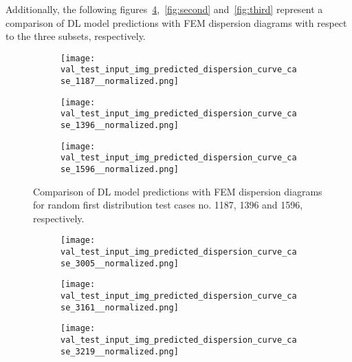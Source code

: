 \documentclass[11pt,a4paper]{report}
\begin{document}
\begin{sloppypar}
		\noindent Additionally, the following figures~\ref{fig:first},~\ref{fig:second} and~\ref{fig:third} represent a comparison of DL model predictions with FEM dispersion diagrams with respect to the three subsets, respectively.
		\begin{figure}[ht!]
			\centering
			\begin{subfigure}[b]{0.32\textwidth}
				\centering
				\texttt{[image: val\_test\_input\_img\_predicted\_dispersion\_curve\_case\_1187\_\_normalized.png]}
				\label{fig:1187}
			\end{subfigure}
			\hfill
			\begin{subfigure}[b]{0.32\textwidth}
				\centering
				\texttt{[image: val\_test\_input\_img\_predicted\_dispersion\_curve\_case\_1396\_\_normalized.png]}
				\label{fig:1396}
			\end{subfigure}
			\hfill
			\begin{subfigure}[b]{0.32\textwidth}
				\centering
				\texttt{[image: val\_test\_input\_img\_predicted\_dispersion\_curve\_case\_1596\_\_normalized.png]}
				\label{fig:1596}
			\end{subfigure}
			\caption{Comparison of DL model predictions with FEM dispersion diagrams for random first distribution test cases no. 1187, 1396 and 1596, respectively.}
			\label{fig:first}			
		\end{figure}
		\begin{figure}[ht!]
			\begin{subfigure}[b]{0.32\textwidth}
				\centering
				\texttt{[image: val\_test\_input\_img\_predicted\_dispersion\_curve\_case\_3005\_\_normalized.png]}
				\label{fig:3005}
			\end{subfigure}
			\hfill
			\begin{subfigure}[b]{0.32\textwidth}
				\centering
				\texttt{[image: val\_test\_input\_img\_predicted\_dispersion\_curve\_case\_3161\_\_normalized.png]}
				\label{fig:3161}
			\end{subfigure}
			\hfill
			\begin{subfigure}[b]{0.32\textwidth}
				\centering
				\texttt{[image: val\_test\_input\_img\_predicted\_dispersion\_curve\_case\_3219\_\_normalized.png]}
				\label{fig:3219}

\end{subfigure}
\end{figure}
\end{sloppypar}
\end{document}
